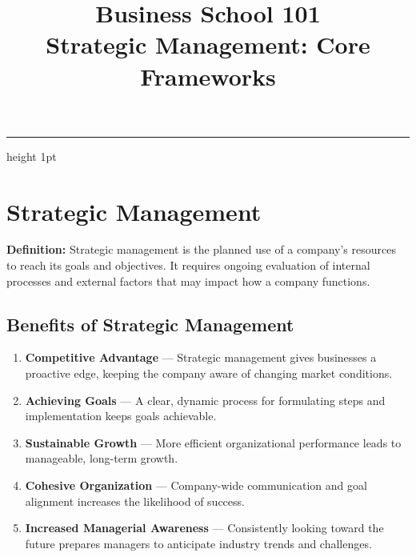 \documentclass[11pt, letterpaper]{article}
\title{
  {\Large\bfseries\color{accent} Business School 101}\\[0.4em]
  {\large Strategic Management: Core Frameworks}
}
\author{}
\date{}
\begin{document}

\maketitle
\vspace{-2em}
\textcolor{rulegray}{\hrule height 1pt}
\vspace{1em}

\tableofcontents
\newpage

\section{Strategic Management}

\begin{defbox}
\textbf{Definition:} Strategic management is the planned use of a company's resources to reach its goals and objectives. It requires ongoing evaluation of internal processes and external factors that may impact how a company functions.
\end{defbox}

\subsection{Benefits of Strategic Management}

\begin{enumerate}[leftmargin=*, label=\textbf{\arabic*.}]
  \item \textbf{Competitive Advantage} --- Strategic management gives businesses a proactive edge, keeping the company aware of changing market conditions.
  \item \textbf{Achieving Goals} --- A clear, dynamic process for formulating steps and implementation keeps goals achievable.
  \item \textbf{Sustainable Growth} --- More efficient organizational performance leads to manageable, long-term growth.
  \item \textbf{Cohesive Organization} --- Company-wide communication and goal alignment increases the likelihood of success.
  \item \textbf{Increased Managerial Awareness} --- Consistently looking toward the future prepares managers to anticipate industry trends and challenges.
\end{enumerate}
\end{document}
